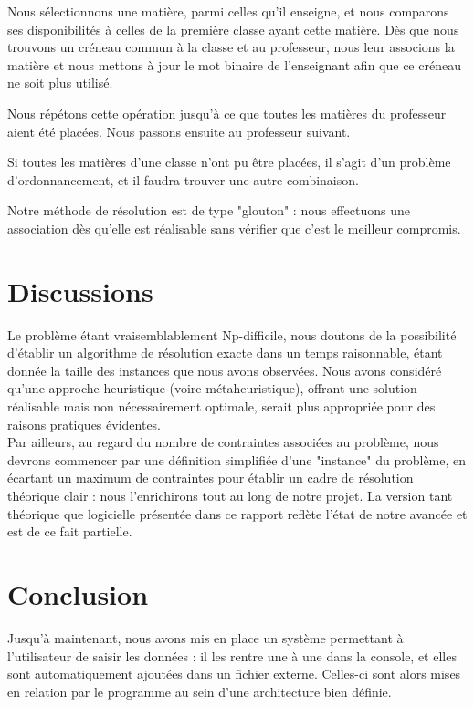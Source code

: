 \documentclass[12pt,a4paper,french]{article}
\begin{document}
Nous sélectionnons une matière, parmi celles qu'il enseigne, et nous comparons ses disponibilités à celles de la première classe ayant cette matière. Dès que nous trouvons un créneau commun à la classe et au professeur, nous leur associons la matière et nous mettons à jour le mot binaire de l'enseignant afin que ce créneau ne soit plus utilisé.

Nous répétons cette opération jusqu'à ce que toutes les matières du professeur aient été placées. Nous passons ensuite au professeur suivant.

Si toutes les matières d'une classe n'ont pu être placées, il s'agit d'un problème d'ordonnancement, et il faudra trouver une autre combinaison.

Notre méthode de résolution est de type "glouton" : nous effectuons une association dès qu'elle est réalisable sans vérifier que c'est le meilleur compromis.\\

\newpage
\section{Discussions}

Le problème étant vraisemblablement Np-difficile, nous doutons de la possibilité d'établir un algorithme de résolution exacte dans un temps raisonnable, étant donnée la taille des instances que nous avons observées. Nous avons considéré qu'une approche heuristique (voire métaheuristique), offrant une solution réalisable mais non nécessairement optimale, serait plus appropriée pour des raisons pratiques évidentes.\\

Par ailleurs, au regard du nombre de contraintes associées au problème, nous devrons commencer par une définition simplifiée d'une "instance" du problème, en écartant un maximum de contraintes pour établir un cadre de résolution théorique clair : nous l'enrichirons tout au long de notre projet. La version tant théorique que logicielle présentée dans ce rapport reflète l'état de notre avancée et est de ce fait partielle.\\

\newpage
\section{Conclusion}

Jusqu'à maintenant, nous avons mis en place un système permettant à l'utilisateur de saisir les données : il les rentre une à une dans la console, et elles sont automatiquement ajoutées dans un fichier externe. Celles-ci sont alors mises en relation par le programme au sein d'une architecture bien définie.\\
\end{document}
